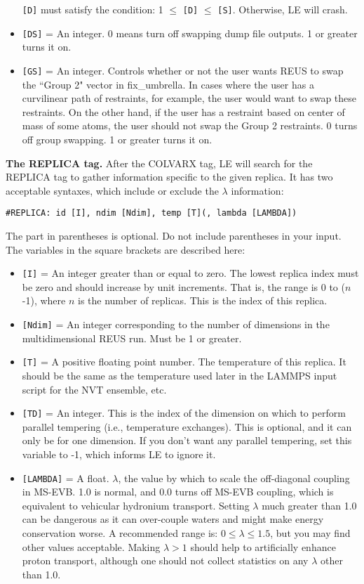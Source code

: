 \documentclass[10pt]{article}
\begin{document}
\begin{itemize}
		\texttt{[D]} must satisfy the condition: 1 $\le$ \texttt{[D]} $\le$ \texttt{[S]}. Otherwise, LE will crash.
\item	\texttt{[DS]} = An integer. 0 means turn off swapping dump file outputs. 1 or greater turns it on.
\item	\texttt{[GS]} = An integer. Controls whether or not the user wants REUS to swap the ``Group 2" vector
		in fix\_umbrella. In cases where the user has a curvilinear path of restraints, for example, the user 
		would want to swap these restraints. On the other hand, if the user has a restraint based on center of mass
		of some atoms, the user should not swap the Group 2 restraints. 0 turns off group swapping. 1 or greater turns it on.
\end{itemize}

\textbf{The REPLICA tag.}
After the COLVARX tag, LE will search for the REPLICA tag to gather information specific
to the given replica. It has two acceptable syntaxes, which include or exclude the $\lambda$ information:
\begin{verbatim}
#REPLICA: id [I], ndim [Ndim], temp [T](, lambda [LAMBDA]) 
\end{verbatim}
The part in parentheses is optional. Do not include parentheses in your input.
The variables in the square brackets are described here:
\begin{itemize}
\item	\texttt{[I]} = An integer greater than or equal to zero. The lowest
		replica index must be zero and should increase by unit increments. That is,
		the range is 0 to ($n$-1), where $n$ is the number of replicas. This is
		the index of this replica.
\item	\texttt{[Ndim]} = An integer corresponding to the number of dimensions
		in the multidimensional REUS run. Must be 1 or greater.
\item	\texttt{[T]} = A positive floating point number. The temperature of this replica.
		It should be the same as the temperature used later in the LAMMPS input script
		for the NVT ensemble, etc.
\item	\texttt{[TD]} = An integer. This is the index of the dimension on which to perform
		parallel tempering (i.e., temperature exchanges). This is optional, and it can only be
		for one dimension. If you don't want any parallel tempering, set this variable to -1,
		which informs LE to ignore it.
\item	\texttt{[LAMBDA]} = A float. $\lambda$, the value by which to scale the off-diagonal coupling in MS-EVB. 1.0 is normal,
		and 0.0 turns off MS-EVB coupling, which is equivalent to vehicular hydronium transport. Setting $\lambda$ much
		greater than 1.0 can be dangerous as it can over-couple waters and might make energy conservation worse. A recommended
		range is: $0 \le \lambda \le 1.5$, but you may find other values acceptable. Making $\lambda > 1$ should help
		to artificially enhance proton transport, although one should not collect statistics on any $\lambda$ other than 1.0.
\end{itemize}
\end{document}

